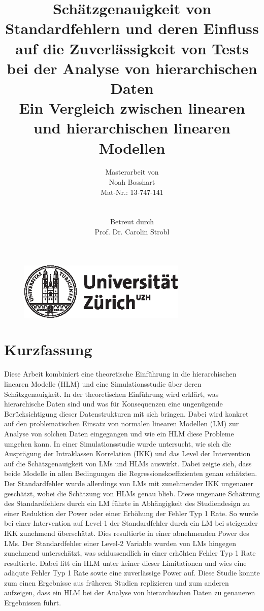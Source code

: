 \documentclass[12pt]{article}\usepackage[]{graphicx}\usepackage[]{color}
\title{Schätzgenauigkeit von Standardfehlern und deren Einfluss auf die Zuverlässigkeit von Tests bei der Analyse von hierarchischen Daten \\ \large{Ein Vergleich zwischen linearen und hierarchischen linearen Modellen}}
\author{Masterarbeit von \\ Noah Bosshart \\ Mat-Nr.: 13-747-141 \\ \\ \\ Betreut durch \\ Prof. Dr. Carolin Strobl}
\begin{document}

\begin{figure}[t]
  \centering
  \includegraphics[width = 8cm]{uzh_logo}
\end{figure}

\maketitle
\thispagestyle{empty}

\newpage
{}
\tableofcontents

\newpage
\listoffigures

\newpage
\listoftables
\newpage


\section*{Kurzfassung}
Diese Arbeit kombiniert eine theoretische Einführung in die hierarchischen linearen Modelle (HLM) und  eine Simulationsstudie über deren Schätzgenauigkeit. In der theoretischen Einführung wird erklärt, was hierarchische Daten sind und was für Konsequenzen eine ungenügende Berücksichtigung dieser Datenstrukturen mit sich bringen. Dabei wird konkret auf den problematischen Einsatz von normalen linearen Modellen (LM) zur Analyse von solchen Daten eingegangen und wie ein HLM diese Probleme umgehen kann. In einer Simulationsstudie wurde untersucht, wie sich die Ausprägung der Intraklassen Korrelation (IKK) und das Level der Intervention auf die Schätzgenauigkeit von LMs und HLMs auswirkt. Dabei zeigte sich, dass beide Modelle in allen Bedingungen die Regressionskoeffizienten genau schätzten. Der Standardfehler wurde allerdings von LMs mit zunehmender IKK ungenauer geschätzt, wobei die Schätzung von HLMs genau blieb. Diese ungenaue Schätzung des Standardfehlers durch ein LM führte in Abhängigkeit des Studiendesign zu einer Reduktion der Power oder einer Erhöhung der Fehler Typ 1 Rate. So wurde bei einer Intervention auf Level-1 der Standardfehler durch ein LM bei steigender IKK zunehmend überschätzt. Dies resultierte in einer abnehmenden Power des LMs. Der Standardfehler einer Level-2 Variable wurden von LMs hingegen zunehmend unterschätzt, was schlussendlich in einer erhöhten Fehler Typ 1 Rate resultierte. Dabei litt ein HLM unter keiner dieser Limitationen und wies eine adäqute Fehler Typ 1 Rate sowie eine zuverlässige Power auf. Diese Studie konnte zum einen Ergebnisse aus früheren Studien replizieren und zum anderen aufzeigen, dass ein HLM bei der Analyse von hierarchischen Daten zu genaueren Ergebnissen führt.
\end{document}
